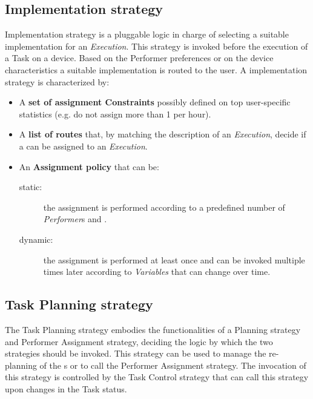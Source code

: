 \subsection{\utask{} Implementation strategy}
\utask{} Implementation strategy is a pluggable logic in charge of selecting a
suitable \utask{} implementation for an \emph{Execution}. This strategy is invoked
before the execution of a Task on a device. Based on the Performer preferences
or on the device characteristics a suitable \utask{} implementation is routed to
the user. A \utask{} implementation strategy is characterized by:
\begin{itemize}
    \item A \textbf{set of assignment Constraints} possibly defined on top user-specific
	statistics (e.g. do not assign more than 1 \utask{} per hour).

    \item A \textbf{list of routes} that, by matching the description of an
    \emph{Execution}, decide if a \utask{} can be assigned to an \emph{Execution}.

    \item An \textbf{Assignment policy} that can be:
        \begin{description}
            \item[static:] the assignment is performed according to a predefined
            number of \emph{Performer}s and \utask{}.
            \item[dynamic:] the assignment is performed at least once and can be
            invoked multiple times later according to \emph{Variables} that can
            change over time.
        \end{description}
\end{itemize}



\subsection{Task Planning strategy}
The Task Planning strategy embodies the functionalities of a \utask{} Planning
strategy and Performer Assignment strategy, deciding the logic by which the
two strategies should be invoked. This strategy can be used to manage the
re-planning of the \utask{}s or to call the Performer Assignment strategy. The
invocation of this strategy is controlled by the Task Control strategy that can
call this strategy upon changes in the Task status.




